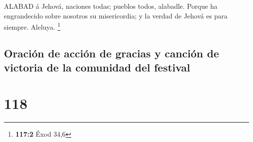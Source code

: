  ALABAD á Jehová, naciones todas; pueblos todos, alabadle.
 Porque ha engrandecido sobre nosotros su misericordia; y la
verdad de Jehová es para siempre. Aleluya. \footnote{\textbf{117:2} Éxod
  34,6}

\hypertarget{oraciuxf3n-de-acciuxf3n-de-gracias-y-canciuxf3n-de-victoria-de-la-comunidad-del-festival}{%
\subsection{Oración de acción de gracias y canción de victoria de la
comunidad del
festival}\label{oraciuxf3n-de-acciuxf3n-de-gracias-y-canciuxf3n-de-victoria-de-la-comunidad-del-festival}}

\hypertarget{section-117}{%
\section{118}\label{section-117}}

